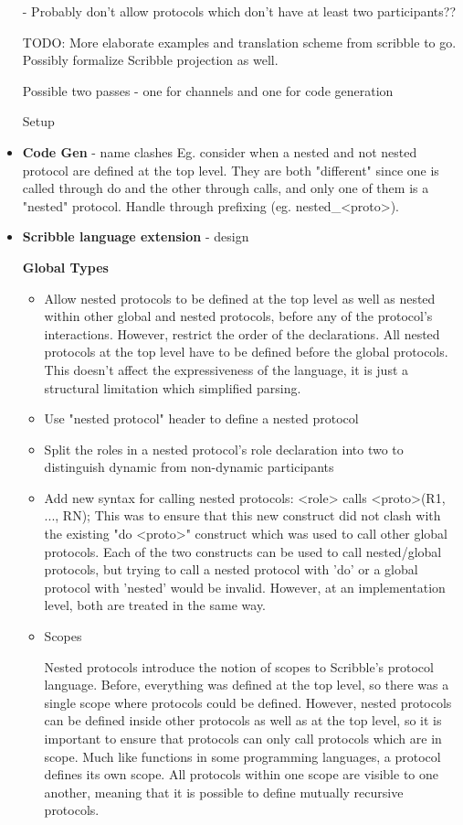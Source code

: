 \documentclass[12pt,twoside]{report}
\begin{document}
\begin{itemize}
    - Probably don't allow protocols which don't have at least two participants??
    
    TODO: More elaborate examples and translation scheme from scribble to go. Possibly formalize Scribble projection as well.
    
    Possible two passes - one for channels and one for code generation
    
    Setup 
    
    \item \textbf{Code Gen} - name clashes
    Eg. consider when a nested and not nested protocol are defined at the top level. They are both "different" since one is called through do and the other through calls, and only one of them is a "nested" protocol. Handle through prefixing (eg. nested\_<proto>).
    
    \item \textbf{Scribble language extension} - design
    
    \textbf{Global Types}
    \begin{itemize}
        \item Allow nested protocols to be defined at the top level as well as nested within other global and nested protocols, before any of the protocol's interactions. However, restrict the order of the declarations. All nested protocols at the top level have to be defined before the global protocols. This doesn't affect the expressiveness of the language, it is just a structural limitation which simplified parsing. 
        \item Use "nested protocol" header to define a nested protocol
        \item Split the roles in a nested protocol's role declaration into two to distinguish dynamic from non-dynamic participants 
        \item Add new syntax for calling nested protocols: <role> calls <proto>(R1, ..., RN);
        This was to ensure that this new construct did not clash with the existing "do <proto>" construct which was used to call other global protocols. Each of the two constructs can be used to call nested/global protocols, but trying to call a nested protocol with 'do' or a global protocol with 'nested' would be invalid. However, at an implementation level, both are treated in the same way.
        \item Scopes
        
        Nested protocols introduce the notion of scopes to Scribble's protocol language. Before, everything was defined at the top level, so there was a single scope where protocols could be defined. However, nested protocols can be defined inside other protocols as well as at the top level, so it is important to ensure that protocols can only call protocols which are in scope. Much like functions in some programming languages, a protocol defines its own scope. All protocols within one scope are visible to one another, meaning that it is possible to define mutually recursive protocols. 
        

\end{itemize}
\end{itemize}
\end{document}
